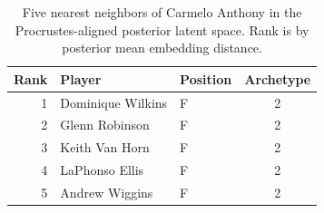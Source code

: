 \begin{table}[htbp]
  \centering\small
  \begin{tabular}{rllc}
    \toprule
    Rank & Player & Position & Archetype \\
    \midrule
    1 & Dominique Wilkins & F & 2 \\
    2 & Glenn Robinson & F & 2 \\
    3 & Keith Van Horn & F & 2 \\
    4 & LaPhonso Ellis & F & 2 \\
    5 & Andrew Wiggins & F & 2 \\
    \bottomrule
  \end{tabular}
  \caption{Five nearest neighbors of Carmelo Anthony in the Procrustes-aligned posterior latent space. Rank is by posterior mean embedding distance.}
  \label{tab:Carmelo_Anthony_neighbors}
\end{table}

